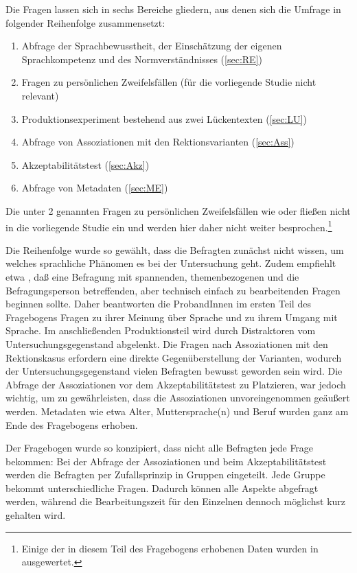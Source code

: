 Die Fragen lassen sich in sechs Bereiche gliedern, aus denen sich die Umfrage in folgender Reihenfolge zusammensetzt: 
\begin{enumerate}
\item Abfrage der Sprachbewusstheit, der Einschätzung der eigenen Sprachkompetenz und des Normverständnisses (\autoref{sec:RE})
\item Fragen zu persönlichen Zweifelsfällen (für die vorliegende Studie nicht relevant)
\item Produktionsexperiment bestehend aus zwei Lückentexten (\autoref{sec:LU})
\item Abfrage von Assoziationen mit den Rektionsvarianten (\autoref{sec:Ass})
\item Akzeptabilitätstest (\autoref{sec:Akz})
\item Abfrage von Metadaten (\autoref{sec:ME})
\end{enumerate}
Die unter 2 genannten Fragen zu persönlichen Zweifelsfällen wie  oder  fließen nicht in die vorliegende Studie ein und werden hier daher nicht weiter besprochen.\footnote{Einige der in diesem Teil des Fragebogens erhobenen Daten wurden in \citet{Vieregge.2019b} ausgewertet.} 

Die Reihenfolge wurde so gewählt, dass die Befragten zunächst nicht wissen, um welches sprachliche Phänomen es bei der Untersuchung geht. Zudem empfiehlt etwa \citet[741]{PorstSept.1996}, \glqq daß eine Befragung mit spannenden, themenbezogenen und die Befragungsperson betreffenden, aber technisch einfach zu bearbeitenden Fragen beginnen\grqq{} sollte. 
Daher beantworten die ProbandInnen im ersten Teil des Fragebogens Fragen zu ihrer Meinung über Sprache und zu ihrem Umgang mit Sprache. Im anschließenden Produktionsteil wird durch Distraktoren vom Untersuchungsgegenstand abgelenkt. 
Die Fragen nach Assoziationen mit den Rektionskasus erfordern eine direkte Gegenüberstellung der Varianten, wodurch der Untersuchungsgegenstand vielen Befragten bewusst geworden sein wird. 
Die Abfrage der Assoziationen vor dem Akzeptabilitätstest zu Platzieren, war jedoch wichtig, um zu gewährleisten, dass die Assoziationen unvoreingenommen geäußert werden. Metadaten wie etwa Alter, Muttersprache(n) und Beruf wurden ganz am Ende des Fragebogens erhoben.

Der Fragebogen wurde so konzipiert, dass nicht alle Befragten jede Frage bekommen: Bei der Abfrage der Assoziationen und beim Akzeptabilitätstest werden die Befragten per Zufallsprinzip in Gruppen eingeteilt. 
Jede Gruppe bekommt unterschiedliche Fragen. 
Dadurch können alle Aspekte abgefragt werden, während die Bearbeitungszeit für den Einzelnen dennoch möglichst kurz gehalten wird. 

